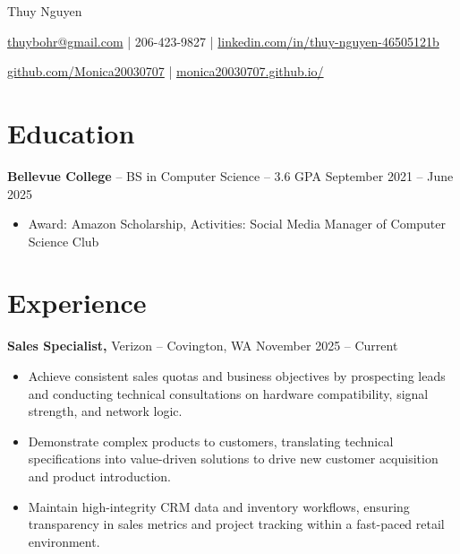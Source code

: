\documentclass[11pt]{article}       %
\begin{document}
\centerline{\Huge Thuy Nguyen}

\vspace{5pt}

\centerline{\href{mailto:thuybohr@gmail.com}{thuybohr@gmail.com} | 206-423-9827 |
\href{https://www.linkedin.com/in/thuy-nguyen-46505121b/}{linkedin.com/in/thuy-nguyen-46505121b}}

\centerline{\href{https://github.com/Monica20030707}{github.com/Monica20030707} | 
\href{https://monica20030707.github.io/}{monica20030707.github.io/}} 

\vspace{-9pt}

\section*{Education}
\textbf{Bellevue College} -- BS in Computer Science -- 3.6 GPA \hfill September 2021 -- June 2025\\
\vspace{-9pt}
\begin{itemize}
  \item Award: Amazon Scholarship, Activities: Social Media Manager of Computer Science Club
\end{itemize}

\vspace{-18.5pt}

\section*{Experience}

\textbf{Sales Specialist,} {Verizon} -- Covington, WA \hfill November 2025 -- Current \\
\vspace{-9pt}
\begin{itemize}
  \item Achieve consistent sales quotas and business objectives by prospecting leads and conducting technical consultations on hardware compatibility, signal strength, and network logic.
  \item Demonstrate complex products to customers, translating technical specifications into value-driven solutions to drive new customer acquisition and product introduction.
  \item Maintain high-integrity CRM data and inventory workflows, ensuring transparency in sales metrics and project tracking within a fast-paced retail environment.
\end{itemize}
\end{document}
